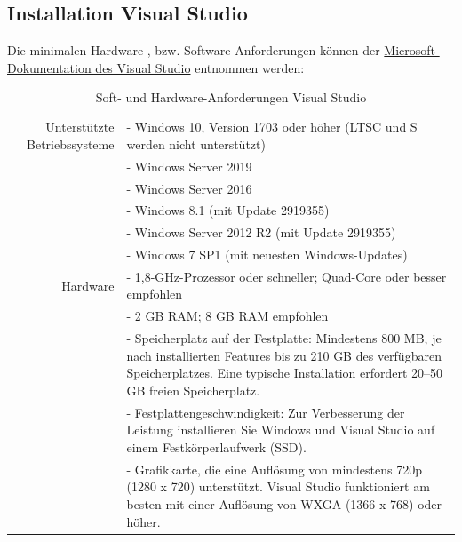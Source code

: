 \subsection{Installation Visual Studio} %
Die minimalen Hardware-, bzw. Software-Anforderungen können der \href{https://docs.microsoft.com/en-us/visualstudio/releases/2019/system-requirements}{Microsoft-Doku\-men\-tation des Visual Studio} entnommen werden:

\begin{table}[H]
    \centering\begin{tabulary}{0.9\linewidth}{|R|L|}
        \hline
        Unterstützte Betriebssysteme
        & - Windows 10, Version 1703 oder höher (LTSC und S werden nicht unterstützt)\\
        & - Windows Server 2019\\
        & - Windows Server 2016\\
        & - Windows 8.1 (mit Update 2919355)\\
        & - Windows Server 2012 R2 (mit Update 2919355)\\
        & - Windows 7 SP1 (mit neuesten Windows-Updates)\\
        \hline
        Hardware
        & - 1,8-GHz-Prozessor oder schneller; Quad-Core oder besser empfohlen\\
        & - 2 GB RAM; 8 GB RAM empfohlen\\
        & - Speicherplatz auf der Festplatte: Mindestens 800 MB, je nach installierten Features bis zu 210 GB des verfügbaren Speicherplatzes. Eine typische Installation erfordert 20–50 GB freien Speicherplatz.\\
        & - Festplattengeschwindigkeit: Zur Verbesserung der Leistung installieren Sie Windows und Visual Studio auf einem Festkörperlaufwerk (SSD).\\
        & - Grafikkarte, die eine Auflösung von mindestens 720p (1280 x 720) unterstützt. Visual Studio funktioniert am besten mit einer Auflösung von WXGA (1366 x 768) oder höher.\\
        \hline
    \end{tabulary}
    \caption{Soft- und Hardware-Anforderungen Visual Studio}    
\end{table}



